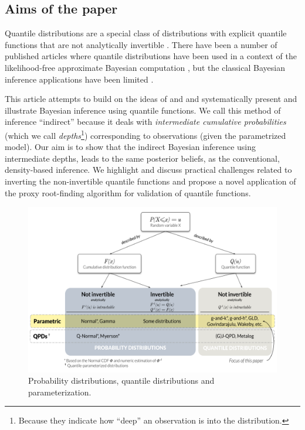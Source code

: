 \documentclass[
  12pt,
]{article}
\begin{document}
\hypertarget{aims-of-the-paper}{%
\subsection{Aims of the paper}\label{aims-of-the-paper}}

Quantile distributions are a special class of distributions with explicit quantile functions that are not analytically invertible \citep{gilchrist2000StatisticalModellingQuantile}. There have been a number of published articles where quantile distributions have been used in a context of the likelihood-free approximate Bayesian computation \citep{allingham2009BayesianEstimationQuantile, drovandi2011LikelihoodfreeBayesianEstimation, karabatsos2018ApproximateLikelihoodPerspective, fearnhead2012ConstructingSummaryStatistics, bernton2019ApproximateBayesianComputation, mcvinish2012ImprovingABCQuantile}, but the classical Bayesian inference applications have been limited \citep{haynes2005BayesianEstimationGandk, rayner2002NumericalMaximumLikelihood}.

This article attempts to build on the ideas of \citet{rayner2002NumericalMaximumLikelihood} and \citet{nair2020BayesianInferenceQuantile} and systematically present and illustrate Bayesian inference using quantile functions. We call this method of inference ``indirect'' because it deals with \emph{intermediate cumulative probabilities} (which we call \emph{depths}\footnote{Because they indicate how ``deep'' an observation is into the distribution.}) corresponding to observations (given the parametrized model). Our aim is to show that the indirect Bayesian inference using intermediate depths, leads to the same posterior beliefs, as the conventional, density-based inference. We highlight and discuss practical challenges related to inverting the non-invertible quantile functions and propose a novel application of the proxy root-finding algorithm for validation of quantile functions.

\begin{figure}

{\centering \includegraphics[width=6in]{img/QDs} 

}

\caption{Probability distributions, quantile distributions and parameterization.}\label{fig:qdist-chart}
\end{figure}
\end{document}

